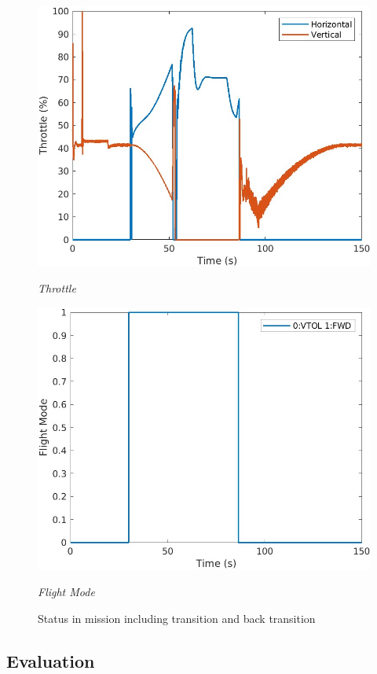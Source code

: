 \begin{figure}[htbp]
\begin{minipage}[b]{0.45\textwidth}
    \includegraphics[width=\textwidth]{Images/TRANS/5 Throttle_1.jpg}
    \caption*{\textit{Throttle}}
  \end{minipage}
  \hfil
  \begin{minipage}[b]{0.45\textwidth}
    \centering
    \includegraphics[width=\textwidth]{Images/TRANS/6 FlightMode_1.jpg}
    \caption*{\textit{Flight Mode}}
  \end{minipage}
  \caption{Status in mission including transition and back transition}
  \label{fig:TRANS mission}
\end{figure}

\subsection{Evaluation}

